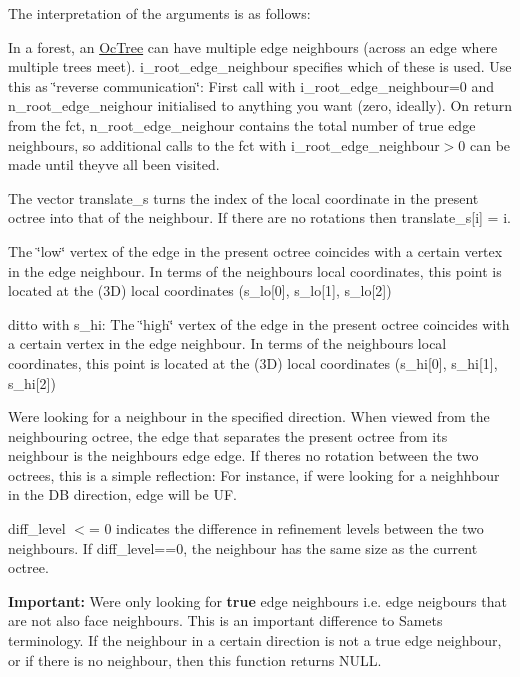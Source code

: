 The interpretation of the arguments is as follows\+:
\begin{DoxyItemize}
\item In a forest, an \hyperlink{classoomph_1_1OcTree}{Oc\+Tree} can have multiple edge neighbours (across an edge where multiple trees meet). {\ttfamily i\+\_\+root\+\_\+edge\+\_\+neighbour} specifies which of these is used. Use this as \char`\"{}reverse communication\char`\"{}\+: First call with {\ttfamily i\+\_\+root\+\_\+edge\+\_\+neighbour=0} and {\ttfamily n\+\_\+root\+\_\+edge\+\_\+neighour} initialised to anything you want (zero, ideally). On return from the fct, {\ttfamily n\+\_\+root\+\_\+edge\+\_\+neighour} contains the total number of true edge neighbours, so additional calls to the fct with {\ttfamily i\+\_\+root\+\_\+edge\+\_\+neighbour$>$0} can be made until they\textquotesingle{}ve all been visited.
\item The vector {\ttfamily translate\+\_\+s} turns the index of the local coordinate in the present octree into that of the neighbour. If there are no rotations then {\ttfamily translate\+\_\+s}\mbox{[}i\mbox{]} = i.
\item The \char`\"{}low\char`\"{} vertex of the edge in the present octree coincides with a certain vertex in the edge neighbour. In terms of the neighbour\textquotesingle{}s local coordinates, this point is located at the (3D) local coordinates ({\ttfamily s\+\_\+lo}\mbox{[}0\mbox{]}, {\ttfamily s\+\_\+lo}\mbox{[}1\mbox{]}, {\ttfamily s\+\_\+lo}\mbox{[}2\mbox{]})
\item ditto with s\+\_\+hi\+: The \char`\"{}high\char`\"{} vertex of the edge in the present octree coincides with a certain vertex in the edge neighbour. In terms of the neighbour\textquotesingle{}s local coordinates, this point is located at the (3D) local coordinates ({\ttfamily s\+\_\+hi}\mbox{[}0\mbox{]}, {\ttfamily s\+\_\+hi}\mbox{[}1\mbox{]}, {\ttfamily s\+\_\+hi}\mbox{[}2\mbox{]})
\item We\textquotesingle{}re looking for a neighbour in the specified {\ttfamily direction}. When viewed from the neighbouring octree, the edge that separates the present octree from its neighbour is the neighbour\textquotesingle{}s edge {\ttfamily edge}. If there\textquotesingle{}s no rotation between the two octrees, this is a simple reflection\+: For instance, if we\textquotesingle{}re looking for a neighhbour in the {\ttfamily DB} {\ttfamily direction}, {\ttfamily edge} will be {\ttfamily UF}.
\item {\ttfamily diff\+\_\+level} $<$= 0 indicates the difference in refinement levels between the two neighbours. If {\ttfamily diff\+\_\+level==0}, the neighbour has the same size as the current octree.
\end{DoxyItemize}{\bfseries Important\+:} We\textquotesingle{}re only looking for {\bfseries true} edge neighbours i.\+e. edge neigbours that are not also face neighbours. This is an important difference to Samet\textquotesingle{}s terminology. If the neighbour in a certain direction is not a true edge neighbour, or if there is no neighbour, then this function returns N\+U\+LL.

